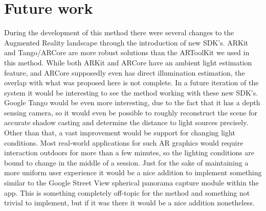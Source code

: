 \section{Future work}
During the development of this method there were several changes to the Augmented Reality landscape through the introduction of new SDK's. ARKit \citep{ARkit} and Tango/ARCore \citep{Tango} are more robust solutions than the ARToolKit we used in this method. While both ARKit and ARCore have an ambient light estimation feature, and ARCore supposedly even has direct illumination estimation, the overlap with what was proposed here is not complete. In a future iteration of the system it would be interesting to see the method working with these new SDK's. Google Tango would be even more interesting, due to the fact that it has a depth sensing camera, so it would even be possible to roughly reconstruct the scene for accurate shadow casting and determine the distance to light sources precisely.\newline
Other than that, a vast improvement would be support for changing light conditions. Most real-world applications for such AR graphics would require interaction outdoors for more than a few minutes, so the lighting conditions are bound to change in the middle of a session.\newline
Just for the sake of maintaining a more uniform user experience it would be a nice addition to implement something similar to the Google Street View spherical panorama capture module within the app. This is something completely off-topic for the method and something not trivial to implement, but if it was there it would be a nice addition nonetheless. 